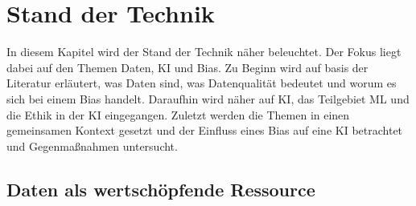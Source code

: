 \chapter{Stand der Technik}
\begin{onehalfspace}  
    \label{sec:theorie/standdertechnik}
        In diesem Kapitel wird der Stand der Technik näher beleuchtet. Der Fokus liegt dabei auf den Themen Daten, \ac{KI} und Bias. Zu Beginn wird auf basis der Literatur erläutert, was Daten sind, was Datenqualität bedeutet und worum es sich bei einem Bias handelt. Daraufhin wird näher auf \ac{KI}, das Teilgebiet \ac{ML} und die Ethik in der \ac{KI} eingegangen. Zuletzt werden die Themen in einen gemeinsamen Kontext gesetzt und der Einfluss eines Bias auf eine \ac{KI} betrachtet und Gegenmaßnahmen untersucht. 
    
    \section{Daten als wertschöpfende Ressource}
    \label{subsec:datenchapter}

\end{onehalfspace}
